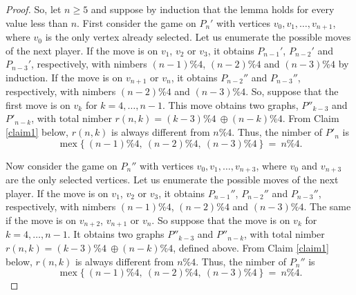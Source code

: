 \documentclass[10pt,a4paper]{amsart}
\DeclareMathOperator{\mex}{mex}
\newcommand{\xor}{\oplus}
\begin{document}
\begin{proof}
So, let $n\geq 5$ and suppose by induction that the lemma holds for every value less than $n$.
First consider the game on $P_n'$ with vertices $v_0,v_1,\ldots,v_{n+1}$, where $v_0$ is the only vertex already selected. Let us enumerate the possible moves of the next player.
If the move is on $v_1$, $v_2$ or $v_3$, it obtains $P_{n-1}'$, $P_{n-2}'$ and $P_{n-3}'$, respectively, with nimbers $(n-1)\% 4$,  $(n-2)\% 4$ and $(n-3)\% 4$ by induction.
If the move is on $v_{n+1}$ or $v_n$, it obtains $P_{n-2}''$ and $P_{n-3}''$, respectively, with nimbers $(n-2)\% 4$ and $(n-3)\% 4$.
So, suppose that the first move is on $v_k$ for $k=4,\ldots,n-1$.
This move obtains two graphs, $P''_{k-3}$ and $P'_{n-k}$, with total nimber $r(n,k)=(k-3)\% 4\ \xor (n-k)\% 4$.
From Claim \ref{claim1} below, $r(n,k)$ is always different from $n\% 4$. Thus, the nimber of $P'_n$ is
\[
\mex\Big\{\ (n-1)\% 4,\ (n-2)\% 4,\ (n-3)\% 4\ \Big\}\ =\ n\% 4.
\]

Now consider the game on $P_n''$ with vertices $v_0,v_1,\ldots,v_{n+3}$, where $v_0$ and $v_{n+3}$ are the only selected vertices. Let us enumerate the possible moves of the next player.
If the move is on $v_1$, $v_2$ or $v_3$, it obtains $P_{n-1}''$, $P_{n-2}''$ and $P_{n-3}''$, respectively, with nimbers $(n-1)\% 4$,  $(n-2)\% 4$ and  $(n-3)\% 4$.
The same if the move is on $v_{n+2}$, $v_{n+1}$ or $v_n$.
So suppose that the move is on $v_k$ for $k=4,\ldots,n-1$.
It obtains two graphs $P''_{k-3}$ and $P''_{n-k}$, with total nimber $r(n,k)=(k-3)\% 4\ \xor (n-k)\% 4$, defined above. From Claim \ref{claim1} below, $r(n,k)$ is always different from $n\% 4$. Thus, the nimber of $P_n''$ is
\[
\mex\Big\{\ (n-1)\% 4,\ (n-2)\% 4,\ (n-3)\% 4\ \Big\}\ =\ n\% 4.
\]
\end{proof}
\end{document}
